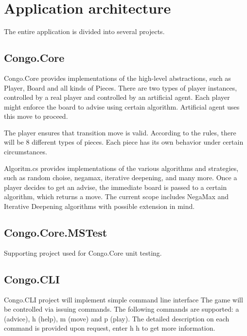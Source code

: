 \section{Application architecture}

The entire application is divided into several projects.

\subsection{Congo.Core}

\textsf{Congo.Core} provides implementations of the high-level abstractions,
such as Player, Board and all kinds of Pieces. There are two types of player
instances, controlled by a real player and controlled by an artificial agent.
Each player might enforce the board to advise using certain algorithm.
Artificial agent uses this move to proceed.

The player
ensures that transition move is valid. According to the rules, there will be 8
different types of pieces. Each piece has its own behavior under certain
circumstances.

\vspace{0.5em}

Algoritm.cs provides implementations of the various algorithms and
strategies, such as random choise, negamax, iterative deepening, and
many more. Once a player decides to get an advise, the immediate board is
passed to a certain algorithm, which returns a move. The current scope includes
\textsf{NegaMax} and \textsf{Iterative Deepening} algorithms with possible
extension in mind.

\subsection{Congo.Core.MSTest}

Supporting project used for \textsf{Congo.Core} unit testing.

\subsection{Congo.CLI}

\textsf{Congo.CLI} project will implement simple command line interface The
game will be controlled via issuing commands. The following commands are
supported: \textsf{a} (advice), \textsf{h} (help), \textsf{m} (move) and
\textsf{p} (play). The detailed description on each command is provided upon
request, enter \textsf{h h} to get more information.

